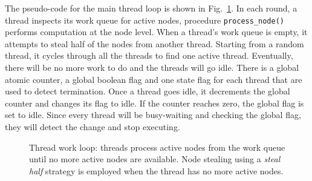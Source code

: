The pseudo-code for the main thread loop is shown in
Fig.~\ref{alg:thread_work_loop}. In each round, a thread inspects its work queue
for active nodes, procedure \texttt{process\_node()} performs computation at the
node level.  When a thread's work queue is empty, it attempts to steal half of
the nodes from another thread. Starting from a random thread, it cycles through
all the threads to find one active thread. Eventually, there will be no more
work to do and the threads will go idle. There is a global atomic counter, a
global boolean flag and one state flag for each thread that are used to detect
termination. Once a thread goes idle, it decrements the global counter and
changes its flag to idle.  If the counter reaches zero, the global flag is set
to idle. Since every thread will be busy-waiting and checking the global flag,
they will detect the change and stop executing.

\begin{figure}
\begin{algorithm}[H]
\end{algorithm}
\caption{Thread work loop: threads process active nodes from the work queue
   until no more active nodes are available. Node stealing using a \emph{steal
      half} strategy is employed when the thread has no more active nodes.}
 \label{alg:thread_work_loop}
\end{figure}

